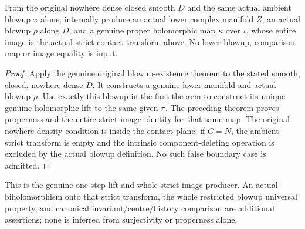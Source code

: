\begin{theorem}
\label{hir:actual-plane-contact-blowup-original-producer}
\leanok
From the original nowhere dense closed smooth $D$ and the same actual
ambient blowup $\pi$ alone, internally produce an actual lower complex
manifold $Z$, an actual blowup $\rho$ along $D$, and a genuine proper
holomorphic map $\kappa$ over $\iota$, whose entire image is the actual
strict contact transform above. No lower blowup, comparison map or image
equality is input.
\end{theorem}
\begin{proof}
Apply the genuine original blowup-existence theorem to the stated smooth,
closed, nowhere dense $D$. It constructs a genuine lower manifold and
actual blowup $\rho$. Use exactly this blowup in the first theorem to
construct its unique genuine holomorphic lift to the same given $\pi$.
The preceding theorem proves properness and the entire strict-image
identity for that same map. The original nowhere-density condition is
inside the contact plane: if $C=N$, the ambient strict transform is empty
and the intrinsic component-deleting operation is excluded by the actual
blowup definition. No such false boundary case is admitted.
\end{proof}

This is the genuine one-step lift and whole strict-image producer. An actual
biholomorphism onto that strict transform, the whole restricted blowup
universal property, and canonical invariant/centre/history comparison are
additional assertions; none is inferred from surjectivity or properness alone.
